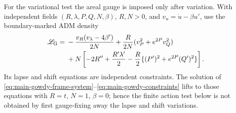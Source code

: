 \documentclass[11pt]{article}
\numberwithin{equation}{section}
\theoremstyle{definition}
\theoremstyle{remark}
\begin{document}
For the variational test the areal gauge is imposed only after variation.  With
independent fields $(R,\lambda,P,Q,N,\beta)$, $R,N>0$, and
$v_u=\dot u-\beta u'$, use the boundary-marked ADM density
\begin{align}
 \mathscr L_{\rm G}={}&
 -\frac{v_R(v_\lambda-4\beta')}{2N}
 +\frac R{2N}(v_P^2+e^{2P}v_Q^2)\nonumber\\
 &+N\left[-2R''+\frac{R'\lambda'}2
 -\frac R2\{(P')^2+e^{2P}(Q')^2\}\right].
 \label{eq:main-gowdy-adm-density}
\end{align}
Its lapse and shift equations are independent constraints.  The solution of
\eqref{eq:main-gowdy-frame-system}--\eqref{eq:main-gowdy-constraints} lifts to
those equations with $R=t$, $N=1$, $\beta=0$; hence the finite action test below
is not obtained by first gauge-fixing away the lapse and shift variations.
\end{document}
